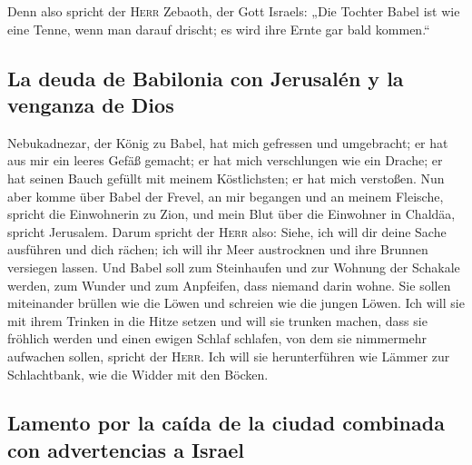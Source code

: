  Denn also spricht der \textsc{Herr} Zebaoth, der Gott
Israels: „Die Tochter Babel ist wie eine Tenne, wenn man darauf drischt;
es wird ihre Ernte gar bald kommen.``

\hypertarget{la-deuda-de-babilonia-con-jerusaluxe9n-y-la-venganza-de-dios}{%
\subsection{La deuda de Babilonia con Jerusalén y la venganza de
Dios}\label{la-deuda-de-babilonia-con-jerusaluxe9n-y-la-venganza-de-dios}}

 Nebukadnezar, der König zu Babel, hat mich gefressen und
umgebracht; er hat aus mir ein leeres Gefäß gemacht; er hat mich
verschlungen wie ein Drache; er hat seinen Bauch gefüllt mit meinem
Köstlichsten; er hat mich verstoßen.  Nun aber komme über
Babel der Frevel, an mir begangen und an meinem Fleische, spricht die
Einwohnerin zu Zion, und mein Blut über die Einwohner in Chaldäa,
spricht Jerusalem.  Darum spricht der \textsc{Herr} also:
Siehe, ich will dir deine Sache ausführen und dich rächen; ich will ihr
Meer austrocknen und ihre Brunnen versiegen lassen.  Und
Babel soll zum Steinhaufen und zur Wohnung der Schakale werden, zum
Wunder und zum Anpfeifen, dass niemand darin wohne.  Sie
sollen miteinander brüllen wie die Löwen und schreien wie die jungen
Löwen.  Ich will sie mit ihrem Trinken in die Hitze
setzen und will sie trunken machen, dass sie fröhlich werden und einen
ewigen Schlaf schlafen, von dem sie nimmermehr aufwachen sollen, spricht
der \textsc{Herr}.  Ich will sie herunterführen wie
Lämmer zur Schlachtbank, wie die Widder mit den Böcken.

\hypertarget{lamento-por-la-cauxedda-de-la-ciudad-combinada-con-advertencias-a-israel}{%
\subsection{Lamento por la caída de la ciudad combinada con advertencias
a
Israel}\label{lamento-por-la-cauxedda-de-la-ciudad-combinada-con-advertencias-a-israel}}

